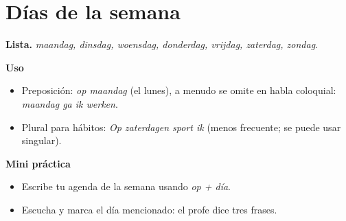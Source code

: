 \section{Días de la semana}
\textbf{Lista.} \textit{maandag, dinsdag, woensdag, donderdag, vrijdag, zaterdag, zondag}.

\textbf{Uso}
\begin{itemize}[leftmargin=*]
  \item Preposición: \textit{op maandag} (el lunes), a menudo se omite en habla coloquial: \textit{maandag ga ik werken}.
  \item Plural para hábitos: \textit{Op zaterdagen sport ik} (menos frecuente; se puede usar singular).
\end{itemize}

\textbf{Mini práctica}
\begin{itemize}[leftmargin=*]
  \item Escribe tu agenda de la semana usando \textit{op + día}.
  \item Escucha y marca el día mencionado: el profe dice tres frases.
\end{itemize}
